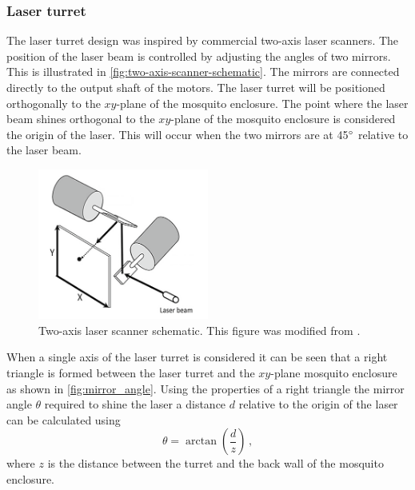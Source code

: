 \subsubsection{Laser turret}
The laser turret design was inspired by commercial two-axis laser scanners. The position of the laser beam is controlled by adjusting the angles of two mirrors. This is illustrated in \autoref{fig:two-axis-scanner-schematic}. The mirrors are connected directly to the output shaft of the motors. The laser turret will be positioned orthogonally to the $xy$-plane of the mosquito enclosure. The point where the laser beam shines orthogonal to the $xy$-plane of the mosquito enclosure is considered the origin of the laser. This will occur when the two mirrors are at 45$^{\circ}$ relative to the laser beam.

\begin{figure}[h]
    \centering
    \includegraphics[width=0.5\textwidth]{figures/hardware_design/two_axis_scanner.png}
    \caption{Two-axis laser scanner schematic. This figure was modified from \cite{two-axis-scanner-schematic}.}
    \label{fig:two-axis-scanner-schematic}
\end{figure}

When a single axis of the laser turret is considered it can be seen that a right triangle is formed between the laser turret and the $xy$-plane mosquito enclosure as shown in \autoref{fig:mirror_angle}. Using the properties of a right triangle the mirror angle $\theta$ required to shine the laser a distance $d$ relative to the origin of the laser can be calculated using
\begin{equation}
    \theta = \arctan{\left(\frac{d}{z}\right)}\,,
    \label{eq:mirror_angle}
\end{equation}
where $z$ is the distance between the turret and the back wall of the mosquito enclosure.

